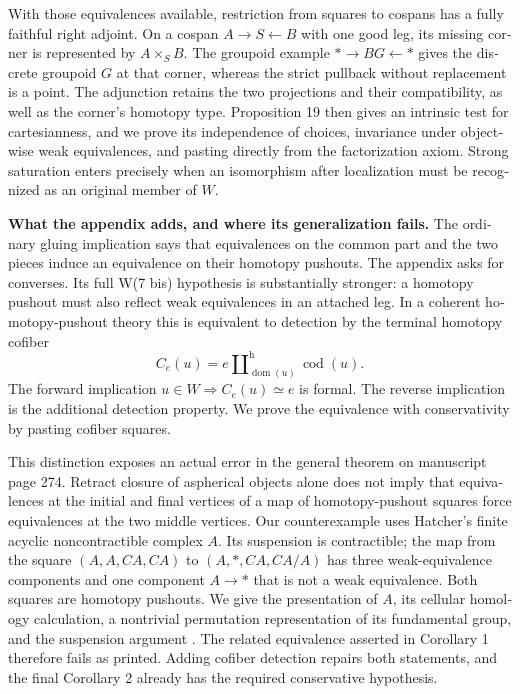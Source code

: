 \begin{otherlanguage}{english}
With those equivalences available, restriction from squares to cospans has a fully faithful right adjoint. On a cospan $A\to S\leftarrow B$ with one good leg, its missing corner is represented by $A\times_S B$. The groupoid example $*\to BG\leftarrow *$ gives the discrete groupoid $G$ at that corner, whereas the strict pullback without replacement is a point. The adjunction retains the two projections and their compatibility, as well as the corner's homotopy type. Proposition 19 then gives an intrinsic test for cartesianness, and we prove its independence of choices, invariance under objectwise weak equivalences, and pasting directly from the factorization axiom. Strong saturation enters precisely when an isomorphism after localization must be recognized as an original member of $W$.

\medskip\noindent\textbf{What the appendix adds, and where its generalization fails.}
The ordinary gluing implication says that equivalences on the common part and the two pieces induce an equivalence on their homotopy pushouts. The appendix asks for converses. Its full W(7 bis) hypothesis is substantially stronger: a homotopy pushout must also reflect weak equivalences in an attached leg. In a coherent homotopy-pushout theory this is equivalent to detection by the terminal homotopy cofiber
\[
 C_e(u)=e\amalg^{\mathrm h}_{\operatorname{dom}(u)}
                         \operatorname{cod}(u).
\]
The forward implication $u\in W\Rightarrow C_e(u)\simeq e$ is formal. The reverse implication is the additional detection property. We prove the equivalence with conservativity by pasting cofiber squares.

This distinction exposes an actual error in the general theorem on manuscript page 274. Retract closure of aspherical objects alone does not imply that equivalences at the initial and final vertices of a map of homotopy-pushout squares force equivalences at the two middle vertices. Our counterexample uses Hatcher's finite acyclic noncontractible complex $A$. Its suspension is contractible; the map from the square $(A,A,CA,CA)$ to $(A,*,CA,CA/A)$ has three weak-equivalence components and one component $A\to *$ that is not a weak equivalence. Both squares are homotopy pushouts. We give the presentation of $A$, its cellular homology calculation, a nontrivial permutation representation of its fundamental group, and the suspension argument \citep[Example~2.38]{Hatcher2002}. The related equivalence asserted in Corollary 1 therefore fails as printed. Adding cofiber detection repairs both statements, and the final Corollary 2 already has the required conservative hypothesis.


\end{otherlanguage}
